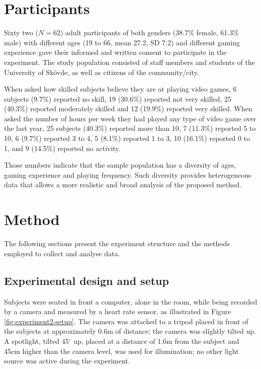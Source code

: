 \section{Participants}

Sixty two ($N=62$) adult participants of both genders (38.7\% female, 61.3\% male) with different ages (19 to 66, mean 27.2, SD 7.2) and different gaming experience gave their informed and written consent to participate in the experiment. The study population consisted of staff members and students of the University of Sk\"ovde, as well as citizens of the community/city.

When asked how skilled subjects believe they are at playing video games, 6 subjects (9.7\%) reported no skill, 19 (30.6\%) reported not very skilled, 25 (40.3\%) reported moderately skilled and 12 (19.9\%) reported very skilled. When asked the number of hours per week they had played any type of video game over the last year, 25 subjects (40.3\%) reported more than 10, 7 (11.3\%) reported 5 to 10, 6 (9.7\%) reported 3 to 4, 5 (8.1\%) reported 1 to 3, 10 (16.1\%) reported 0 to 1, and 9 (14.5\%) reported no activity.

Those numbers indicate that the sample population has a diversity of ages, gaming experience and playing frequency. Such diversity provides heterogeneous data that allows a more realistic and broad analysis of the proposed method.

\section{Method}

The following sections present the experiment structure and the methods employed to collect and analyse data.

\subsection{Experimental design and setup}

Subjects were seated in front a computer, alone in the room, while being recorded by a camera and measured by a heart rate sensor, as illustrated in Figure \ref{fig:experiment2-setup}. The camera was attached to a tripod placed in front of the subjects at approximately 0.6m of distance; the camera was slightly tilted up. A spotlight, tilted 45$^{\circ}$ up, placed at a distance of 1.6m from the subject and 45cm higher than the camera level, was used for illumination; no other light source was active during the experiment.

